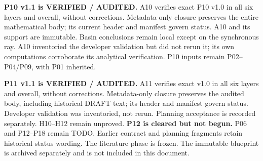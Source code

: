 \documentclass[11pt]{article}
\begin{document}
\smallskip\noindent\textbf{P10 v1.1 is VERIFIED / AUDITED.}
A10 verifies exact P10 v1.0 in all six layers and overall, without corrections.
Metadata-only closure preserves the entire mathematical body; its current
header and manifest govern status. A10 and its support are immutable.
Basin conclusions remain local except on the synchronous ray. A10
inventoried the developer validation but did not rerun it; its own
computations corroborate its analytical verification. P10 inputs remain
P02--P04/P09, with P01 inherited.

\smallskip\noindent\textbf{P11 v1.1 is VERIFIED / AUDITED.}
A11 verifies exact v1.0 in all six layers and overall, without corrections.
Metadata-only closure preserves the audited body, including historical DRAFT
text; its header and manifest govern status. Developer validation was
inventoried, not rerun. Planning acceptance is recorded separately.
H10--H12 remain unproved. \textbf{P12 is cleared but not begun.}
P06 and P12--P18 remain TODO.
Earlier contract and planning fragments retain historical status wording.
The literature phase is frozen. The immutable blueprint is archived
separately and is not included in this document.
\endgroup
\clearpage
\tableofcontents
\clearpage




\clearpage

\clearpage

\clearpage

\clearpage

\clearpage

\clearpage

\clearpage

\clearpage

\clearpage

\clearpage

\clearpage

\clearpage

\clearpage

\clearpage

\clearpage

\clearpage

\clearpage

\clearpage

\clearpage
\appendix




\end{document}
